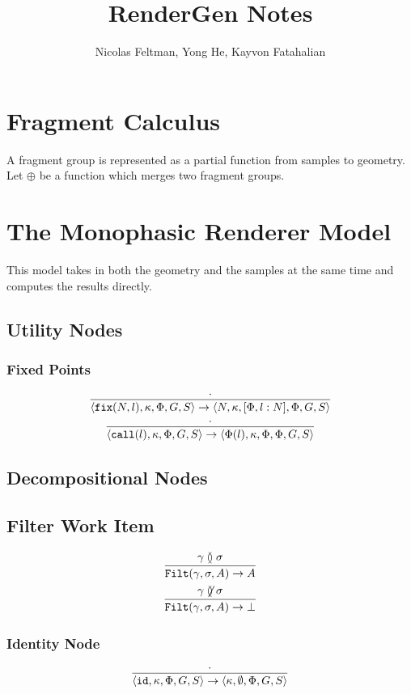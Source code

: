 \documentclass{article}
\title{\Large\textbf{ RenderGen Notes}}
\author{Nicolas Feltman, Yong He, Kayvon Fatahalian}
\newcommand {\fix}{\mathtt{fix}}
\newcommand {\call}{\mathtt{call}}
\newcommand {\id}{\mathtt{id}}
\newcommand {\filt}{\mathtt{Filt}}
\newcommand{\isect}{\between}
\newcommand{\nisect}{\not \between}
\begin{document}
\maketitle

\section{Fragment Calculus}

A fragment group is represented as a partial function from samples to geometry.  Let $\oplus$ be a function which merges two fragment groups.  

\section{The Monophasic Renderer Model}

This model takes in both the geometry and the samples at the same time and computes the results directly.

\subsection{Utility Nodes}
\subsubsection{Fixed Points}
\begin{gather}
\infer{\langle \fix(N,l), \kappa, \Phi, G, S\rangle \to\langle N, \kappa, [\Phi, l:N], \Phi, G, S \rangle}{ \cdot }
\\
\infer{\langle \call(l), \kappa, \Phi, G, S \rangle \to \langle \Phi(l), \kappa, \Phi, \Phi, G, S \rangle }{\cdot}
\end{gather}

\subsection{Decompositional Nodes}

\subsection{Filter Work Item}
\begin{gather}
\infer {\filt(\gamma, \sigma, A) \to A}{\gamma \isect \sigma}
\\
\infer {\filt(\gamma, \sigma, A) \to \bot}{\gamma \nisect \sigma}
\end{gather}

\subsubsection{Identity Node}
\begin{gather}
\infer {\langle\id, \kappa, \Phi,G, S \rangle \to \langle \kappa, \emptyset, \Phi, G, S \rangle}{\cdot}
\end{gather}
\end{document}
